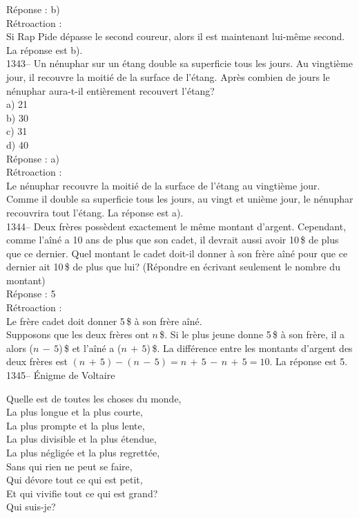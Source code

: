 ﻿\documentclass[letterpaper, 12pt]{article}
\begin{document}
R\'eponse : b)\\

R\'etroaction : \\
Si Rap Pide d\'epasse le second coureur, alors il est maintenant lui-m\^eme
second.  La r\'eponse est b).\\

1343-- Un n\'enuphar sur un \'etang double sa superficie tous les jours.  Au
vingti\`eme jour, il recouvre la moiti\'e de la surface de l'\'etang.
Apr\`es combien de jours le n\'enuphar aura-t-il enti\`erement recouvert
l'\'etang?\\
a) 21\\
b) 30\\
c) 31\\
d) 40\\

R\'eponse : a)\\

R\'etroaction : \\
Le n\'enuphar recouvre la moiti\'e de la surface de l'\'etang au vingti\`eme
jour.  Comme il double sa superficie tous les jours, au vingt et uni\`eme
jour, le n\'enuphar recouvrira tout l'\'etang.  La r\'eponse est a).\\

1344-- Deux fr\`eres poss\`edent exactement le m\^eme montant d'argent.
Cependant, comme l'a\^in\'e a 10 ans de plus que son cadet, il devrait aussi
avoir 10\,\$ de plus que ce dernier. Quel montant le cadet doit-il donner
\`a son fr\`ere a\^in\'e pour que ce dernier ait 10\,\$ de plus que lui?
(R\'epondre en \'ecrivant seulement le nombre du montant)\\

R\'eponse : 5\\

R\'etroaction : \\
Le fr\`ere cadet doit donner 5\,\$ \`a son fr\`ere a\^in\'e.  \\
Supposons que les deux fr\`eres ont $n$\,\$.  Si le plus jeune donne 5\,\$
\`a son fr\`ere, il a alors ($n\,-\,5$)\,\$ et l'a\^in\'e a ($n\,+\,5$)\,\$.
  La diff\'erence entre les montants d'argent des deux fr\`eres est
$(n\,+\,5)-(n\,-\,5)=n\,+\,5\,-\,n\,+\,5=10$.  La r\'eponse est 5.\\

1345-- \'Enigme de Voltaire\\
\begin{center}{Quelle est de toutes les choses du monde,\\
La plus longue et la plus courte,\\
La plus prompte et la plus lente,\\
La plus divisible et la plus \'etendue,\\
La plus n\'eglig\'ee et la plus regrett\'ee,\\
Sans qui rien ne peut se faire,\\
Qui d\'evore tout ce qui est petit,\\
Et qui vivifie tout ce qui est grand?\\
Qui suis-je?\\}
\end{center}
\end{document}
